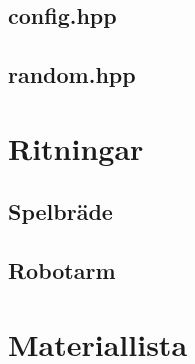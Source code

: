 \documentclass[a4paper]{article}
\begin{document}
\begin{appendix}
\subsection{config.hpp}

\subsection{random.hpp}


\section{Ritningar}
\subsection{Spelbräde}
\subsection{Robotarm}

\section{Materiallista}
\end{appendix}
\end{document}
